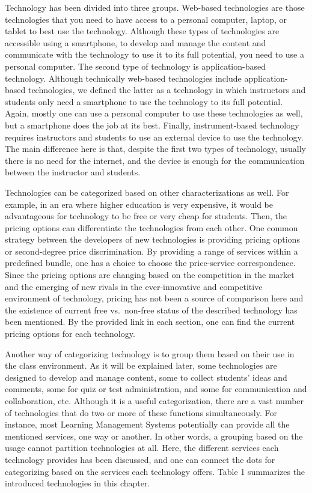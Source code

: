 \documentclass{book}
\begin{document}
Technology has been divided into three groups. Web-based technologies are
those technologies that you need to have access to a personal computer,
laptop, or tablet to best use the technology. Although these types of
technologies are accessible using a smartphone, to develop and manage the
content and communicate with the technology to use it to its full potential,
you need to use a personal computer. The second type of technology is
application-based technology. Although technically web-based technologies
include application-based technologies, we defined the latter as a technology
in which instructors and students only need a smartphone to use the technology
to its full potential. Again, mostly one can use a personal computer to use
these technologies as well, but a smartphone does the job at its best.
Finally, instrument-based technology requires instructors and students to use
an external device to use the technology. The main difference here is that,
despite the first two types of technology, usually there is no need for the
internet, and the device is enough for the communication between the
instructor and students.

Technologies can be categorized based on other characterizations as well. For
example, in an era where higher education is very expensive, it would be
advantageous for technology to be free or very cheap for students. Then, the
pricing options can differentiate the technologies from each other. One common
strategy between the developers of new technologies is providing pricing
options or second-degree price discrimination. By providing a range of
services within a predefined bundle, one has a choice to choose the
price-service correspondence. Since the pricing options are changing based on
the competition in the market and the emerging of new rivals in the
ever-innovative and competitive environment of technology, pricing has not
been a source of comparison here and the existence of current free
vs.~non-free status of the described technology has been mentioned. By the
provided link in each section, one can find the current pricing options for
each technology.

Another way of categorizing technology is to group them based on their use in
the class environment. As it will be explained later, some technologies are
designed to develop and manage content, some to collect students' ideas and
comments, some for quiz or test administration, and some for communication and
collaboration, etc. Although it is a useful categorization, there are a vast
number of technologies that do two or more of these functions simultaneously.
For instance, most Learning Management Systems potentially can provide all the
mentioned services, one way or another. In other words, a grouping based on
the usage cannot partition technologies at all. Here, the different services
each technology provides has been discussed, and one can connect the dots for
categorizing based on the services each technology offers. Table 1 summarizes
the introduced technologies in this chapter.
\end{document}
